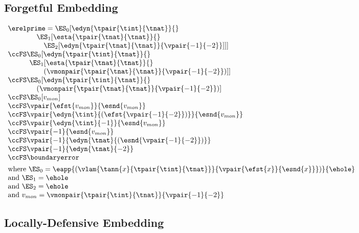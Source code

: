 \subsection{Forgetful Embedding}

$\begin{array}{l}
  \erelprime = \ES_0[\edyn{\tpair{\tint}{\tnat}}{}
\\\qquad\qquad \ES_1[\esta{\tpair{\tnat}{\tnat}}{}
\\\qquad\qquad\quad \ES_2[\edyn{\tpair{\tnat}{\tnat}}{\vpair{-1}{-2}}]]]
\\\ccFS \ES_0[\edyn{\tpair{\tint}{\tnat}}{}
\\\qquad\quad \ES_1[\esta{\tpair{\tnat}{\tnat}}{}
\\\qquad\qquad\quad (\vmonpair{\tpair{\tnat}{\tnat}}{\vpair{-1}{-2}})]]
\\\ccFS \ES_0[\edyn{\tpair{\tint}{\tnat}}{}
\\\qquad\qquad (\vmonpair{\tpair{\tnat}{\tnat}}{\vpair{-1}{-2}})]
\\\ccFS \ES_0[v_{mon}]
\\\ccFS \vpair{\efst{v_{mon}}}{\esnd{v_{mon}}}
\\\ccFS \vpair{\edyn{\tint}{(\efst{\vpair{-1}{-2}})}}{\esnd{v_{mon}}}
\\\ccFS \vpair{\edyn{\tint}{{-1}}}{\esnd{v_{mon}}}
\\\ccFS \vpair{{-1}}{\esnd{v_{mon}}}
\\\ccFS \vpair{{-1}}{\edyn{\tnat}{(\esnd{\vpair{-1}{-2}})}}
\\\ccFS \vpair{{-1}}{\edyn{\tnat}{-2}}
\\\ccFS \boundaryerror
\\[1ex]
  \mbox{where } \ES_0 = \eapp{(\vlam{\tann{x}{\tpair{\tint}{\tnat}}}{\vpair{\efst{x}}{\esnd{x}}})}{\ehole}
\\\mbox{and } \ES_1 = \ehole
\\\mbox{and } \ES_2 = \ehole
\\\mbox{and } v_{mon} = \vmonpair{\tpair{\tint}{\tnat}}{\vpair{-1}{-2}}
\end{array}$

\subsection{Locally-Defensive Embedding}

